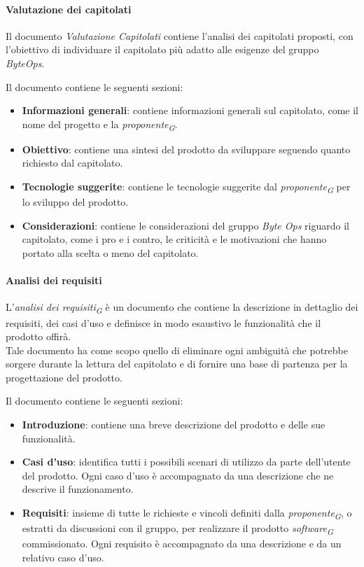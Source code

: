 \paragraph{Valutazione dei capitolati}
Il documento \textit{Valutazione Capitolati} contiene l'analisi dei capitolati proposti, con l'obiettivo di individuare il capitolato più adatto alle esigenze del gruppo \textit{ByteOps}. 

Il documento contiene le seguenti sezioni:
\begin{itemize}
    \item \textbf{Informazioni generali}: contiene informazioni generali sul capitolato, come il nome del progetto e la \textit{proponente}\textsubscript{\textit{G}}. 
    \item \textbf{Obiettivo}: contiene una sintesi del prodotto da sviluppare seguendo quanto richiesto dal capitolato. 
    \item \textbf{Tecnologie suggerite}: contiene le tecnologie suggerite dal \textit{proponente}\textsubscript{\textit{G}} per lo sviluppo del prodotto. 
    \item \textbf{Considerazioni}: contiene le considerazioni del gruppo \textit{Byte Ops} riguardo il capitolato, come i pro e i contro, le criticità e le motivazioni che hanno portato alla scelta o meno del capitolato. 
\end{itemize}

\paragraph{Analisi dei requisiti}
L'\textit{analisi dei requisiti}\textsubscript{\textit{G}} è un documento che contiene la descrizione in dettaglio dei requisiti, dei casi d'uso e definisce in modo esaustivo le funzionalità che il prodotto offirà. \\
Tale documento ha come scopo quello di eliminare ogni ambiguità che potrebbe sorgere durante la lettura del capitolato e di fornire una base di partenza per la progettazione del prodotto.

Il documento contiene le seguenti sezioni:
\begin{itemize}
    \item \textbf{Introduzione}: contiene una breve descrizione del prodotto e delle sue funzionalità.
    \item \textbf{Casi d'uso}: identifica tutti i possibili scenari di utilizzo da parte dell'utente del prodotto. Ogni caso d'uso è accompagnato da una descrizione che ne descrive il funzionamento.
    \item \textbf{Requisiti}: insieme di tutte le richieste e vincoli definiti dalla \textit{proponente}\textsubscript{\textit{G}}, o estratti da discussioni con il gruppo, per realizzare il prodotto \textit{software}\textsubscript{\textit{G}} commissionato. Ogni requisito è accompagnato da una descrizione e da un relativo caso d'uso. 
\end{itemize}

